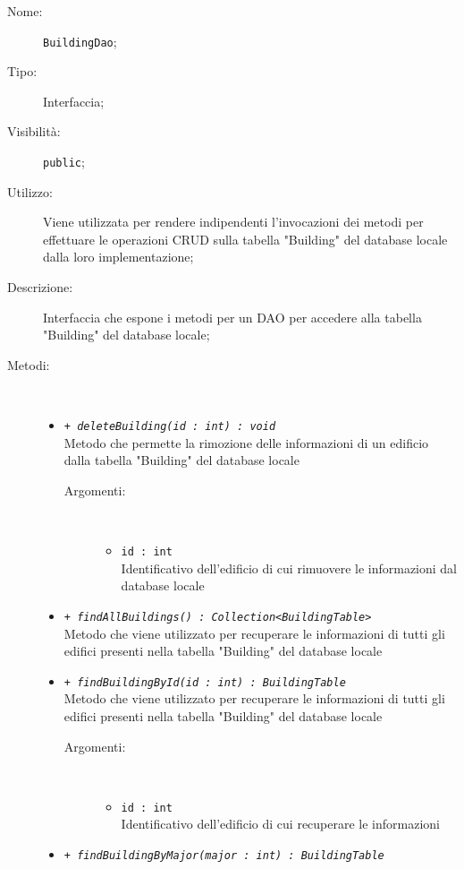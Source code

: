 \documentclass[../DefinizioneDiProdotto.tex]{subfiles}
\begin{document}
    \begin{description}
\item[Nome:] \texttt{BuildingDao};
\item[Tipo:] Interfaccia;
\item[Visibilità:] \texttt{public};
\item[Utilizzo:] Viene utilizzata per rendere indipendenti l'invocazioni dei metodi per effettuare le operazioni CRUD sulla tabella "Building" del database locale dalla loro implementazione;
\item[Descrizione:] Interfaccia che espone i metodi per un DAO per accedere alla tabella "Building" del database locale;
\item[Metodi:] \
\begin{itemize}
\item \texttt{+ \textit{deleteBuilding(id : int) : void}}\\
Metodo che permette la rimozione delle informazioni di un edificio dalla tabella "Building" del database locale 
 \begin{description}
\item[Argomenti:] \
\begin{itemize}
\item \texttt{id : int}\\
Identificativo dell'edificio di cui rimuovere le informazioni dal database locale\end{itemize}
\end{description}
\item \texttt{+ \textit{findAllBuildings() : Collection<BuildingTable>}}\\
Metodo che viene utilizzato per recuperare le informazioni di tutti gli edifici presenti nella tabella "Building" del database locale
 \item \texttt{+ \textit{findBuildingById(id : int) : BuildingTable}}\\
Metodo che viene utilizzato per recuperare le informazioni di tutti gli edifici presenti nella tabella "Building" del database locale
 \begin{description}
\item[Argomenti:] \
\begin{itemize}
\item \texttt{id : int}\\
Identificativo dell'edificio di cui recuperare le informazioni\end{itemize}
\end{description}
\item \texttt{+ \textit{findBuildingByMajor(major : int) : BuildingTable}}\\

\end{itemize}
\end{description}
\end{document}
